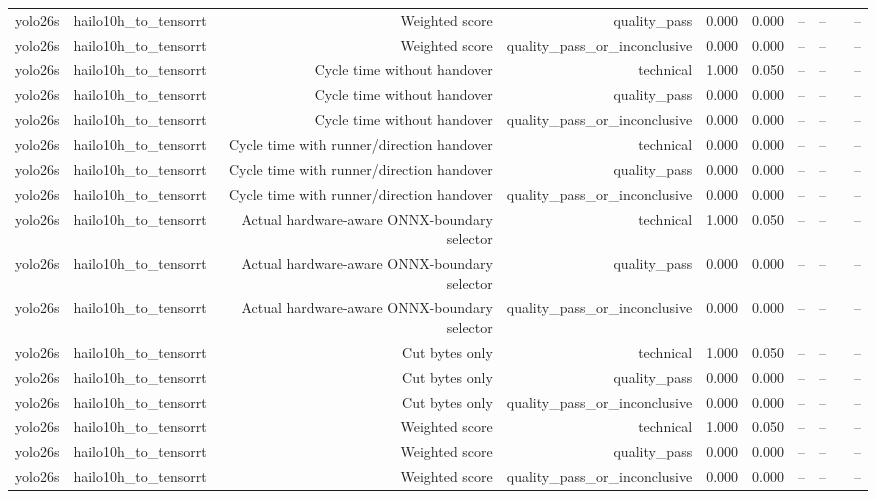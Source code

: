 \begin{table}[t]
\begin{tabular}{lrrrrrrrrr}
yolo26s & hailo10h\_to\_tensorrt & Weighted score & quality\_pass & 0.000 & 0.000 & -- & -- &  & -- \\
yolo26s & hailo10h\_to\_tensorrt & Weighted score & quality\_pass\_or\_inconclusive & 0.000 & 0.000 & -- & -- &  & -- \\
yolo26s & hailo10h\_to\_tensorrt & Cycle time without handover & technical & 1.000 & 0.050 & -- & -- &  & -- \\
yolo26s & hailo10h\_to\_tensorrt & Cycle time without handover & quality\_pass & 0.000 & 0.000 & -- & -- &  & -- \\
yolo26s & hailo10h\_to\_tensorrt & Cycle time without handover & quality\_pass\_or\_inconclusive & 0.000 & 0.000 & -- & -- &  & -- \\
yolo26s & hailo10h\_to\_tensorrt & Cycle time with runner/direction handover & technical & 0.000 & 0.000 & -- & -- &  & -- \\
yolo26s & hailo10h\_to\_tensorrt & Cycle time with runner/direction handover & quality\_pass & 0.000 & 0.000 & -- & -- &  & -- \\
yolo26s & hailo10h\_to\_tensorrt & Cycle time with runner/direction handover & quality\_pass\_or\_inconclusive & 0.000 & 0.000 & -- & -- &  & -- \\
yolo26s & hailo10h\_to\_tensorrt & Actual hardware-aware ONNX-boundary selector & technical & 1.000 & 0.050 & -- & -- &  & -- \\
yolo26s & hailo10h\_to\_tensorrt & Actual hardware-aware ONNX-boundary selector & quality\_pass & 0.000 & 0.000 & -- & -- &  & -- \\
yolo26s & hailo10h\_to\_tensorrt & Actual hardware-aware ONNX-boundary selector & quality\_pass\_or\_inconclusive & 0.000 & 0.000 & -- & -- &  & -- \\
yolo26s & hailo10h\_to\_tensorrt & Cut bytes only & technical & 1.000 & 0.050 & -- & -- &  & -- \\
yolo26s & hailo10h\_to\_tensorrt & Cut bytes only & quality\_pass & 0.000 & 0.000 & -- & -- &  & -- \\
yolo26s & hailo10h\_to\_tensorrt & Cut bytes only & quality\_pass\_or\_inconclusive & 0.000 & 0.000 & -- & -- &  & -- \\
yolo26s & hailo10h\_to\_tensorrt & Weighted score & technical & 1.000 & 0.050 & -- & -- &  & -- \\
yolo26s & hailo10h\_to\_tensorrt & Weighted score & quality\_pass & 0.000 & 0.000 & -- & -- &  & -- \\
yolo26s & hailo10h\_to\_tensorrt & Weighted score & quality\_pass\_or\_inconclusive & 0.000 & 0.000 & -- & -- &  & -- \\

\end{tabular}
\end{table}
